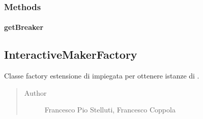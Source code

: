 \documentclass[letterpaper,10pt,italian]{sphinxmanual}
\begin{document}
\subsubsection{Methods}
\label{\detokenize{source/it/unicam/cs/pa/mastermind/factories/InteractiveBreakerFactory:methods}}

\paragraph{getBreaker}
\label{\detokenize{source/it/unicam/cs/pa/mastermind/factories/InteractiveBreakerFactory:getbreaker}}

\begin{fulllineitems}
\label{\detokenize{source/it/unicam/cs/pa/mastermind/factories/InteractiveBreakerFactory:it.unicam.cs.pa.mastermind.factories.InteractiveBreakerFactory.getBreaker()}}
\end{fulllineitems}



\subsection{InteractiveMakerFactory}
\label{\detokenize{source/it/unicam/cs/pa/mastermind/factories/InteractiveMakerFactory:interactivemakerfactory}}\label{\detokenize{source/it/unicam/cs/pa/mastermind/factories/InteractiveMakerFactory::doc}}

\begin{fulllineitems}
\label{\detokenize{source/it/unicam/cs/pa/mastermind/factories/InteractiveMakerFactory:it.unicam.cs.pa.mastermind.factories.InteractiveMakerFactory}}
Classe factory estensione di  impiegata per ottenere istanze di .
\begin{quote}\begin{description}
\item[{Author}] \leavevmode
Francesco Pio Stelluti, Francesco Coppola

\end{description}\end{quote}

\end{fulllineitems}
\end{document}
